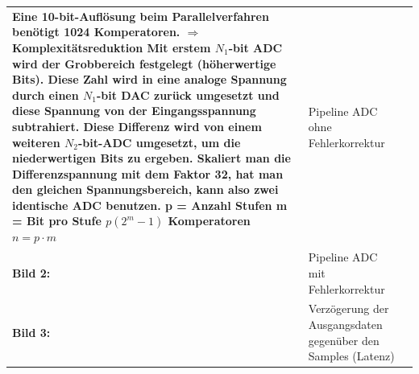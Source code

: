 \begin{longtable}{|>{\bfseries}p{4cm}|p{6cm}|p{8cm}|}
    Eine 10-bit-Auflösung beim Parallelverfahren benötigt 1024 Komperatoren. $\Rightarrow$Komplexitätsreduktion \newline
    Mit erstem $N_{1}$-bit ADC wird der Grobbereich festgelegt (höherwertige
    Bits). Diese Zahl wird in eine analoge Spannung durch einen $N_{1}$-bit DAC zurück
    umgesetzt und diese Spannung von der Eingangsspannung subtrahiert. Diese
    Differenz wird von einem weiteren $N_{2}$-bit-ADC umgesetzt, um die
    niederwertigen Bits zu ergeben. Skaliert man die Differenzspannung mit dem
    Faktor 32, hat man den gleichen Spannungsbereich, kann also zwei identische
    ADC benutzen. \newline
    p = Anzahl Stufen \newline
    m = Bit pro Stufe \newline
    $p(2^m-1)$ Komperatoren \newline
    $n = p \cdot m$ \newline
    \begin{tabular}{lp{6cm}}
      Bild 1: & Pipeline ADC ohne Fehlerkorrektur \\
      Bild 2: & Pipeline ADC mit Fehlerkorrektur \\
      Bild 3: & Verzögerung der Ausgangsdaten gegenüber den Samples (Latenz)
    \end{tabular} \\
  \hline
\end{longtable}


